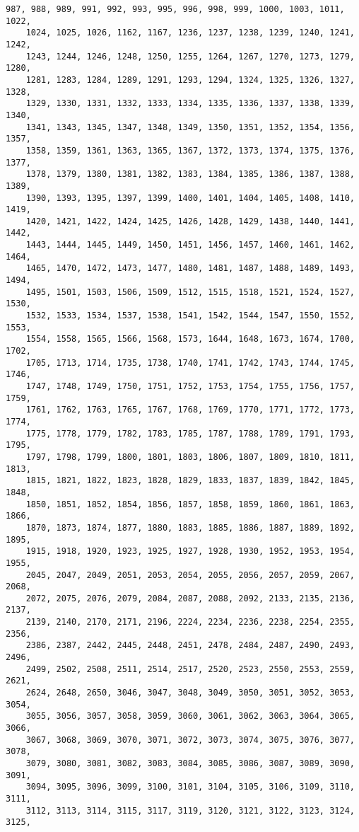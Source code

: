 \documentclass[a4paper,11pt]{report}
\begin{document}
{{\begin{Verbatim}[commandchars=!@|,fontsize=\small,frame=single,label=Example]
    987, 988, 989, 991, 992, 993, 995, 996, 998, 999, 1000, 1003, 1011, 1022,
    1024, 1025, 1026, 1162, 1167, 1236, 1237, 1238, 1239, 1240, 1241, 1242,
    1243, 1244, 1246, 1248, 1250, 1255, 1264, 1267, 1270, 1273, 1279, 1280,
    1281, 1283, 1284, 1289, 1291, 1293, 1294, 1324, 1325, 1326, 1327, 1328,
    1329, 1330, 1331, 1332, 1333, 1334, 1335, 1336, 1337, 1338, 1339, 1340,
    1341, 1343, 1345, 1347, 1348, 1349, 1350, 1351, 1352, 1354, 1356, 1357,
    1358, 1359, 1361, 1363, 1365, 1367, 1372, 1373, 1374, 1375, 1376, 1377,
    1378, 1379, 1380, 1381, 1382, 1383, 1384, 1385, 1386, 1387, 1388, 1389,
    1390, 1393, 1395, 1397, 1399, 1400, 1401, 1404, 1405, 1408, 1410, 1419,
    1420, 1421, 1422, 1424, 1425, 1426, 1428, 1429, 1438, 1440, 1441, 1442,
    1443, 1444, 1445, 1449, 1450, 1451, 1456, 1457, 1460, 1461, 1462, 1464,
    1465, 1470, 1472, 1473, 1477, 1480, 1481, 1487, 1488, 1489, 1493, 1494,
    1495, 1501, 1503, 1506, 1509, 1512, 1515, 1518, 1521, 1524, 1527, 1530,
    1532, 1533, 1534, 1537, 1538, 1541, 1542, 1544, 1547, 1550, 1552, 1553,
    1554, 1558, 1565, 1566, 1568, 1573, 1644, 1648, 1673, 1674, 1700, 1702,
    1705, 1713, 1714, 1735, 1738, 1740, 1741, 1742, 1743, 1744, 1745, 1746,
    1747, 1748, 1749, 1750, 1751, 1752, 1753, 1754, 1755, 1756, 1757, 1759,
    1761, 1762, 1763, 1765, 1767, 1768, 1769, 1770, 1771, 1772, 1773, 1774,
    1775, 1778, 1779, 1782, 1783, 1785, 1787, 1788, 1789, 1791, 1793, 1795,
    1797, 1798, 1799, 1800, 1801, 1803, 1806, 1807, 1809, 1810, 1811, 1813,
    1815, 1821, 1822, 1823, 1828, 1829, 1833, 1837, 1839, 1842, 1845, 1848,
    1850, 1851, 1852, 1854, 1856, 1857, 1858, 1859, 1860, 1861, 1863, 1866,
    1870, 1873, 1874, 1877, 1880, 1883, 1885, 1886, 1887, 1889, 1892, 1895,
    1915, 1918, 1920, 1923, 1925, 1927, 1928, 1930, 1952, 1953, 1954, 1955,
    2045, 2047, 2049, 2051, 2053, 2054, 2055, 2056, 2057, 2059, 2067, 2068,
    2072, 2075, 2076, 2079, 2084, 2087, 2088, 2092, 2133, 2135, 2136, 2137,
    2139, 2140, 2170, 2171, 2196, 2224, 2234, 2236, 2238, 2254, 2355, 2356,
    2386, 2387, 2442, 2445, 2448, 2451, 2478, 2484, 2487, 2490, 2493, 2496,
    2499, 2502, 2508, 2511, 2514, 2517, 2520, 2523, 2550, 2553, 2559, 2621,
    2624, 2648, 2650, 3046, 3047, 3048, 3049, 3050, 3051, 3052, 3053, 3054,
    3055, 3056, 3057, 3058, 3059, 3060, 3061, 3062, 3063, 3064, 3065, 3066,
    3067, 3068, 3069, 3070, 3071, 3072, 3073, 3074, 3075, 3076, 3077, 3078,
    3079, 3080, 3081, 3082, 3083, 3084, 3085, 3086, 3087, 3089, 3090, 3091,
    3094, 3095, 3096, 3099, 3100, 3101, 3104, 3105, 3106, 3109, 3110, 3111,
    3112, 3113, 3114, 3115, 3117, 3119, 3120, 3121, 3122, 3123, 3124, 3125,

\end{Verbatim}}}
\end{document}
